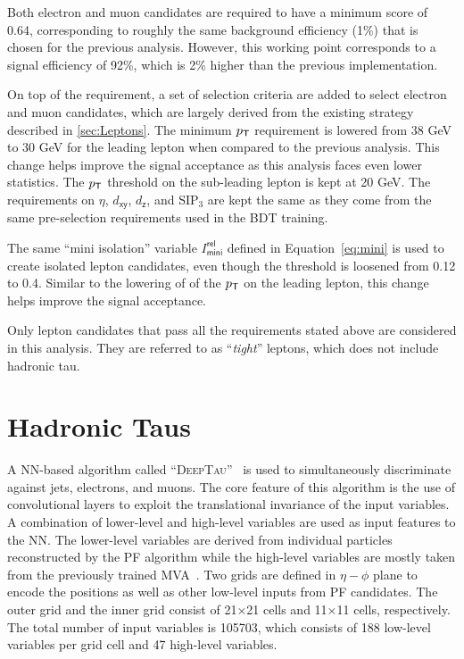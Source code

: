 Both electron and muon candidates are required to have a minimum \TOP score of 0.64, corresponding to roughly the same background efficiency (1\%) that is chosen for the previous analysis. However, this working point corresponds to a signal efficiency of 92\%, which is 2\% higher than the previous implementation.

On top of the \TOP requirement, a set of selection criteria are added to select electron and muon candidates, which are largely derived from the existing strategy described in \autoref{sec:Leptons}. The minimum $p_{\textsf{T}}$ requirement is lowered from 38 GeV to 30 GeV for the leading lepton when compared to the previous analysis. This change helps improve the signal acceptance as this analysis faces even lower statistics. The $p_{\textsf{T}}$ threshold on the sub-leading lepton is kept at 20 GeV. The requirements on $\eta$, $d_{\textsf{xy}}$, $d_{\textsf{z}}$, and SIP$_3$ are kept the same as they come from the same pre-selection requirements used in the \ac{BDT} training. 

The same ``mini isolation'' variable $I^{\textsf{rel}}_{\textsf{mini}}$ defined in Equation~\ref{eq:mini} is used to create isolated lepton candidates, even though the threshold is loosened from 0.12 to 0.4. Similar to the lowering of of the $p_{\textsf{T}}$ on the leading lepton, this change helps improve the signal acceptance.

Only lepton candidates that pass all the requirements stated above are considered in this analysis. They are referred to as ``\emph{tight}'' leptons, which does not include hadronic tau.

\section{Hadronic Taus}
\label{sec:Taus}

A \ac{NN}-based algorithm called ``\textsc{DeepTau}''~\cite{CMS:2022prd} is used to simultaneously discriminate
against jets, electrons, and muons. The core feature of this algorithm is the use of convolutional layers to exploit the translational invariance of the input variables. A combination of lower-level and high-level variables are used as input features to the \ac{NN}. The lower-level variables are derived from individual particles reconstructed by the \ac{PF} algorithm while the high-level variables are mostly taken from the previously trained \ac{MVA}~\cite{CMS:2015pac}. Two grids are defined in $\eta-\phi$ plane to encode the positions as well as other low-level inputs from \ac{PF} candidates. The outer grid and the inner grid consist of 21$\times$21 cells and 11$\times$11 cells, respectively. The total number of input variables is 105703, which consists of 188 low-level variables per grid cell and 47 high-level variables.

